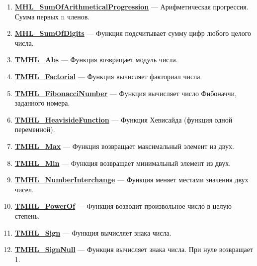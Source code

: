 \documentclass[a4paper,12pt]{article}
\begin{document}
\begin{enumerate}
\item \textbf{\hyperref[MHL_SumOfArithmeticalProgression]{MHL\_SumOfArithmeticalProgression}} --- Арифметическая прогрессия. Сумма первых n членов.

\item \textbf{\hyperref[MHL_SumOfDigits]{MHL\_SumOfDigits}} --- Функция подсчитывает сумму цифр любого целого числа.

\item \textbf{\hyperref[TMHL_Abs]{TMHL\_Abs}} --- Функция возвращает модуль числа.

\item \textbf{\hyperref[TMHL_Factorial]{TMHL\_Factorial}} --- Функция вычисляет факториал числа.

\item \textbf{\hyperref[TMHL_FibonacciNumber]{TMHL\_FibonacciNumber}} --- Функция вычисляет число Фибоначчи, заданного номера.

\item \textbf{\hyperref[TMHL_HeavisideFunction]{TMHL\_HeavisideFunction}} --- Функция Хевисайда (функция одной переменной).

\item \textbf{\hyperref[TMHL_Max]{TMHL\_Max}} --- Функция возвращает максимальный элемент из двух.

\item \textbf{\hyperref[TMHL_Min]{TMHL\_Min}} --- Функция возвращает минимальный элемент из двух.

\item \textbf{\hyperref[TMHL_NumberInterchange]{TMHL\_NumberInterchange}} --- Функция меняет местами значения двух чисел.

\item \textbf{\hyperref[TMHL_PowerOf]{TMHL\_PowerOf}} --- Функция возводит произвольное число в целую степень.

\item \textbf{\hyperref[TMHL_Sign]{TMHL\_Sign}} --- Функция вычисляет знака числа.

\item \textbf{\hyperref[TMHL_SignNull]{TMHL\_SignNull}} --- Функция вычисляет знака числа. При нуле возвращает 1.

\end{enumerate}
\end{document}
